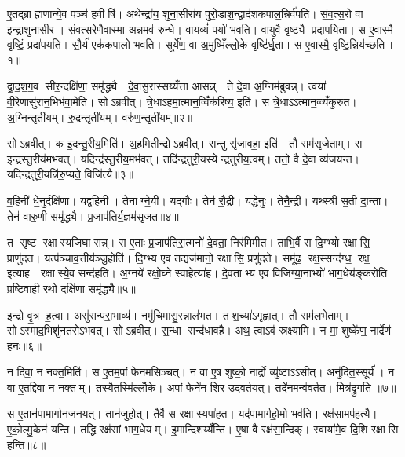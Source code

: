 
\clearpage
{}
\setcounter{anuvakam}{0}
ए॒तद्ब्राह्मणान्ये॒व पञ्च॑ ह॒वीषि॑। अथेन्द्रा॑य॒ शुना॒सीरा॑य पुरो॒डाश॒न्द्वाद॑शकपाल॒न्निर्व॑पति। सं॒व॒त्स॒रो वा इन्द्रा॒शुना॒सीर॑। सं॒व॒त्स॒रेणै॒वास्मा॒ अन्न॒मव॑ रुन्धे। वा॒य॒व्यं॑ पयो॑ भवति। वा॒युर्वै वृष्ट्यै प्रदापयि॒ता। स ए॒वास्मै॒ वृष्टिं॒ प्रदा॑पयति। सौ॒र्य॑ एक॑कपालो भवति। सूर्ये॑ण॒ वा अ॒मुष्मिँ॑ल्लो॒के वृष्टि॑र्धृ॒ता। स ए॒वास्मै॒ वृष्टि॒न्निय॑च्छति॥१॥

द्वा॒द॒श॒ग॒व सीर॒न्दक्षि॑णा॒ समृ॑द्ध्यै। दे॒वा॒सु॒रास्सय्यँ॑त्ता आसन्न्। ते दे॒वा अ॒ग्निम॑ब्रुवन्न्। त्वया॑ वी॒रेणासु॑रान॒भिभ॑वा॒मेति॑। सोऽब्रवीत्। त्रे॒धाऽहमा॒त्मान॒व्विँक॑रिष्य॒ इति॑। स त्रे॒धाऽऽत्मान॒व्व्यँ॑कुरुत। अ॒ग्निन्तृती॑यम्। रु॒द्रन्तृती॑यम्। वरु॑ण॒न्तृती॑यम्॥२॥

सोऽब्रवीत्। क इ॒दन्तु॒रीय॒मिति॑। अ॒हमितीन्द्रोऽब्रवीत्। सन्तु सृ॑जावहा॒ इति॑। तौ सम॑सृजेताम्। स इन्द्र॑स्तु॒रीय॑मभवत्। यदिन्द्र॑स्तु॒रीय॒मभ॑वत्। तदि॑न्द्रतुरी॒यस्येन्द्रतुरीय॒त्वम्। ततो॒ वै दे॒वा व्य॑जयन्त। यदि॑न्द्रतुरी॒यन्नि॑रु॒प्यते॒ विजि॑त्यै॥३॥

व॒हिनी॑ धे॒नुर्दक्षि॑णा। यद्व॒हिनी। तेनाग्ने॒यी। यद्गौः। तेन॑ रौ॒द्री। यद्धे॒नुः। तेनै॒न्द्री। यथ्स्त्री स॒ती दा॒न्ता। तेन॑ वारु॒णी समृ॑द्ध्यै। प्र॒जाप॑तिर्य॒ज्ञम॑सृजत॥४॥

त सृ॒ष्ट रक्षास्यजिघासन्न्। स ए॒ताः प्र॒जाप॑तिरा॒त्मनो॑ दे॒वता॒ निर॑मिमीत। ताभि॒र्वै स दि॒ग्भ्यो रक्षासि॒ प्राणु॑दत। यत्प॑ञ्चाव॒त्तीय॑ञ्जु॒होति॑। दि॒ग्भ्य ए॒व तद्यज॑मानो॒ रक्षासि॒ प्रणु॑दते। समू॑ढ॒ रक्ष॒स्सन्द॑ग्ध॒ रक्ष॒ इत्या॑ह। रक्षास्ये॒व सन्द॑हति। अ॒ग्नये॑ रक्षो॒घ्ने स्वाहेत्या॑ह। दे॒वताभ्य ए॒व वि॑जिग्या॒नाभ्यो॑ भाग॒धेय॑ङ्करोति। प्र॒ष्टि॒वा॒ही रथो॒ दक्षि॑णा॒ समृ॑द्ध्यै॥५॥

इन्द्रो॑ वृ॒त्र ह॒त्वा। असु॑रान्परा॒भाव्य॑। नमु॑चिमासु॒रन्नाल॑भत। तश॒च्या॑ऽगृह्णात्। तौ सम॑लभेताम्। सोऽस्माद॒भिशु॑नतरोऽभवत्। सोऽब्रवीत्। स॒न्धा सन्द॑धावहै। अथ॒ त्वाऽव॑ स्रक्ष्यामि। न मा॒ शुष्के॑ण॒ नार्द्रेण॑ हनः॥६॥

न दिवा॒ न नक्त॒मिति॑। स ए॒तम॒पां फेन॑मसिञ्चत्। न वा ए॒ष शुष्को॒ नार्द्रो व्यु॑ष्टाऽऽसीत्। अनु॑दित॒स्सूर्य॑। न वा ए॒तद्दिवा॒ न नक्तम्। तस्यै॒तस्मि॑ल्लोँ॒के। अ॒पां फेने॑न॒ शिर॒ उद॑वर्तयत्। तदे॑न॒मन्व॑वर्तत। मित्र॑द्रु॒गति॑ ॥७॥

स ए॒तान॑पामा॒र्गान॑जनयत्। तान॑जुहोत्। तैर्वै स रक्षा॒स्यपा॑हत। यद॑पामार्गहो॒मो भव॑ति। रक्ष॑सा॒मप॑हत्यै। ए॒को॒ल्मु॒केन॑ यन्ति। तद्धि रक्ष॑सां भाग॒धेयम्। इ॒मान्दिश॑य्यँन्ति। ए॒षा वै रक्ष॑सा॒न्दिक्। स्वाया॑मे॒व दि॒शि रक्षासि हन्ति॥८॥

